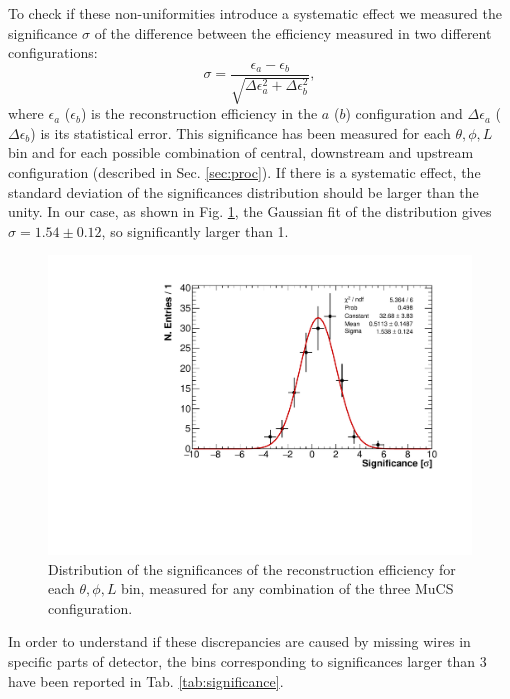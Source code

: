 \documentclass[a4paper]{scrartcl}
\begin{document}
To check if these non-uniformities introduce a systematic effect we measured the significance $\sigma$ of the difference between the efficiency measured in two different configurations:
\begin{equation}
\sigma = \frac{\epsilon_a-\epsilon_b}{\sqrt{\Delta \epsilon_{a}^2 + \Delta \epsilon_b^2}},
\end{equation}
where $\epsilon_{a}$ ($\epsilon_{b}$) is the reconstruction efficiency in the $a$ ($b$) configuration and $\Delta \epsilon_{a}$ ($\Delta \epsilon_{b}$) is its statistical error. This significance has been measured for each $\theta,\phi,L$ bin and for each possible combination of central, downstream and upstream configuration (described in Sec. \ref{sec:proc}). If there is a systematic effect, the standard deviation of the significances distribution should be larger than the unity. In our case, as shown in Fig. \ref{fig:significance}, the Gaussian fit of the distribution gives $\sigma = 1.54\pm0.12$, so significantly larger than 1.

\begin{figure}[htbp]
  \begin{center}
    \includegraphics[width=0.7\linewidth]{figures/significance.pdf}
    \caption{Distribution of the significances of the reconstruction efficiency for each $\theta,\phi,L$ bin, measured for any combination of the three MuCS configuration.} \label{fig:significance}
  \end{center}
\end{figure}

In order to understand if these discrepancies are caused by missing wires in specific parts of detector, the bins corresponding to significances larger than 3 have been reported in Tab. \ref{tab:significance}.
\end{document}
